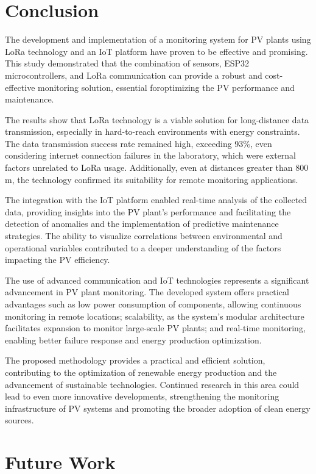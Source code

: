 \section{Conclusion}
\label{sec:conc}

The development and implementation of a monitoring system for PV plants using LoRa technology  and an IoT platform have proven to be effective and promising. This study demonstrated that the combination of sensors, ESP32 microcontrollers, and LoRa communication can provide a robust and cost-effective monitoring solution, essential foroptimizing the PV performance and maintenance.

The results show that LoRa technology is a viable solution for long-distance data transmission, especially in hard-to-reach environments with energy constraints. The data transmission success rate remained high, exceeding 93\%, even considering internet connection failures in the laboratory, which were external factors unrelated to LoRa usage. Additionally, even at distances greater than 800 m, the technology confirmed its suitability for remote monitoring applications.

The integration with the IoT platform enabled real-time analysis of the collected data, providing insights into the PV plant’s performance  and facilitating the detection of anomalies and the implementation of predictive maintenance strategies. The ability to visualize correlations between environmental and operational variables contributed to a deeper understanding of the factors impacting the PV efficiency.

The use of advanced communication and IoT technologies represents a significant advancement in PV plant monitoring. The developed system offers practical advantages such as low power consumption of components, allowing continuous monitoring in remote locations; scalability, as the system's modular architecture facilitates expansion to monitor large-scale PV plants; and real-time monitoring, enabling better failure response and energy production optimization.

The proposed methodology provides a practical and efficient solution, contributing to the optimization of renewable energy production and the advancement of sustainable technologies. Continued research in this area could lead to even more innovative developments, strengthening the monitoring infrastructure of PV systems and promoting the broader adoption of clean energy sources.


\section{Future Work}
\label{sec:future}

